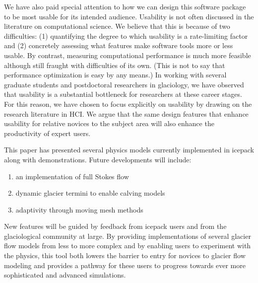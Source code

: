 \documentclass{article}
\theoremstyle{definition}
\theoremstyle{plain}
\begin{document}
We have also paid special attention to how we can design this software package to be most usable for its intended audience.
Usability is not often discussed in the literature on computational science.
We believe that this is because of two difficulties: (1) quantifying the degree to which usability is a rate-limiting factor and (2) concretely assessing what features make software tools more or less usable.
By contrast, measuring computational performance is much more feasible although still fraught with difficulties of its own.
(This is not to say that performance optimization is easy by any means.)
In working with several graduate students and postdoctoral researchers in glaciology, we have observed that usability is a substantial bottleneck for researchers at these career stages.
For this reason, we have chosen to focus explicitly on usability by drawing on the research literature in HCI.
We argue that the same design features that enhance usability for relative novices to the subject area will also enhance the productivity of expert users.

This paper has presented several physics models currently implemented in icepack along with demonstrations.
Future developments will include:
\begin{enumerate}
    \item an implementation of full Stokes flow
    \item dynamic glacier termini to enable calving models
    \item adaptivity through moving mesh methods
\end{enumerate}
New features will be guided by feedback from icepack users and from the glaciological community at large.
By providing implementations of several glacier flow models from less to more complex and by enabling users to experiment with the physics, this tool both lowers the barrier to entry for novices to glacier flow modeling and provides a pathway for these users to progress towards ever more sophisticated and advanced simulations.



\end{document}
